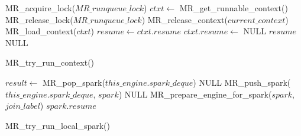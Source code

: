 \begin{algorithm}[tbp]
\begin{algorithmic}
    \State MR\_acquire\_lock($MR\_runqueue\_lock$)
    \State $ctxt \gets$ MR\_get\_runnable\_context()
    \State MR\_release\_lock($MR\_runqueue\_lock$)
            \State MR\_release\_context($current\_context$)
        \EndIf
        \State MR\_load\_context($ctxt$)
        \State $resume \gets ctxt.resume$
        \State $ctxt.resume \gets$ NULL
        \State \Return $resume$
    \Else
        \State \Return NULL
    \EndIf
\EndProcedure
\end{algorithmic}
\caption{MR\_try\_run\_context()}
\label{alg:try_run_context}
\end{algorithm}

\begin{algorithm}[tbp]
\begin{algorithmic}
    \State $result \gets$ MR\_pop\_spark($this\_engine.spark\_deque$)
        \State \Return NULL
    \EndIf
        \State MR\_push\_spark($this\_engine.spark\_deque$, $spark$)
        \State \Return NULL
    \EndIf
    \State MR\_prepare\_engine\_for\_spark($spark$, $join\_label$)
    \State \Return $spark.resume$
\EndProcedure
\end{algorithmic}
\caption{MR\_try\_run\_local\_spark()}
\label{alg:try_run_local_spark}
\end{algorithm}

